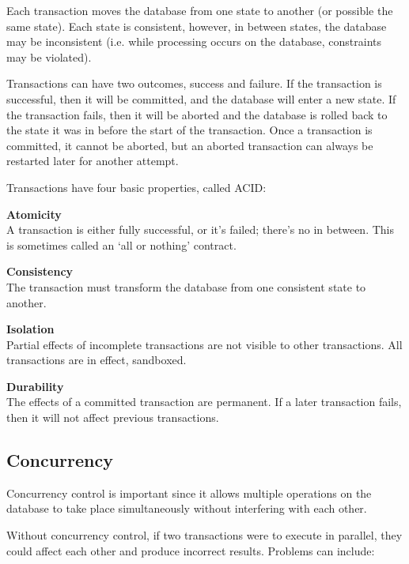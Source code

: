 Each transaction moves the database from one state to another (or possible the
same state). Each state is consistent, however, in between states, the database
may be inconsistent (i.e. while processing occurs on the database, constraints
may be violated).

Transactions can have two outcomes, success and failure. If the transaction is
successful, then it will be committed, and the database will enter a new state.
If the transaction fails, then it will be aborted and the database is rolled
back to the state it was in before the start of the transaction. Once a
transaction is committed, it cannot be aborted, but an aborted transaction can
always be restarted later for another attempt.

Transactions have four basic properties, called ACID:

\begin{description}
  \item \textbf{Atomicity}\\
    A transaction is either fully successful, or it's failed; there's no
    in between. This is sometimes called an `all or nothing' contract.
  \item \textbf{Consistency}\\
    The transaction must transform the database from one consistent state to
    another.
  \item \textbf{Isolation}\\
    Partial effects of incomplete transactions are not visible to other
    transactions. All transactions are in effect, sandboxed.
  \item \textbf{Durability}\\
    The effects of a committed transaction are permanent. If a later transaction
    fails, then it will not affect previous transactions.
\end{description}

\subsection{Concurrency}

Concurrency control is important since it allows multiple operations on the
database to take place simultaneously without interfering with each other.

Without concurrency control, if two transactions were to execute in parallel,
they could affect each other and produce incorrect results. Problems can include:

